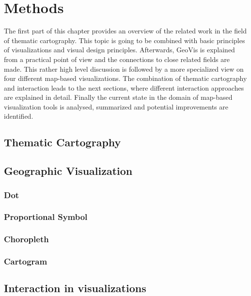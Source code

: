 \section{Methods}
The first part of this chapter provides an overview of the related work in the field of
thematic cartography. This topic is going to be combined with basic principles of visualizations and visual design principles. Afterwards, \ac{GeoVis} is explained from a practical point of view and the connections to close related fields are made. This rather high level discussion is followed by a more specialized view on four different map-based visualizations. The combination of thematic cartography and interaction leads to the next sections, where different interaction approaches are explained in detail. Finally the current state in the domain of map-based visualization tools is analysed, summarized and potential improvements are identified.

\subsection{Thematic Cartography}
\label{s:cartography}


\subsection{Geographic Visualization}

\subsubsection{Dot}

\subsubsection{Proportional Symbol}

\subsubsection{Choropleth}

\subsubsection{Cartogram}

\subsection{Interaction in visualizations}
\label{s:interaction}

